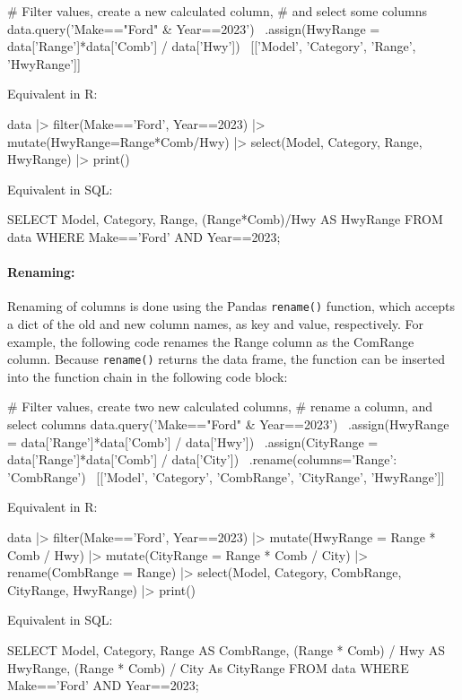 \begin{pythoncode}
# Filter values, create a new calculated column,
# and select some columns
data.query('Make=="Ford" & Year==2023') \
    .assign(HwyRange = data['Range']*data['Comb'] / data['Hwy']) \
    [['Model', 'Category', 'Range', 'HwyRange']]
\end{pythoncode}

\begin{multicols}{2}
Equivalent in R:
\begin{Rcode}
data |> 
  filter(Make=='Ford', 
         Year==2023) |> 
  mutate(HwyRange=Range*Comb/Hwy) |>
  select(Model, Category, 
         Range, HwyRange) |>
  print()
\end{Rcode}

Equivalent in SQL:

\begin{sqlcode}
SELECT Model, Category, Range, 
     (Range*Comb)/Hwy AS HwyRange 
   FROM data 
   WHERE Make=='Ford' AND 
         Year==2023;
\end{sqlcode}
\end{multicols}

\paragraph*{Renaming:} Renaming of columns is done using the Pandas \texttt{rename()} function, which accepts a dict of the old and new column names, as key and value, respectively. For example, the following code renames the Range column as the ComRange column. Because \texttt{rename()} returns the data frame, the function can be inserted into the function chain in the following code block:

\begin{pythoncode}
# Filter values, create two new calculated columns,
# rename a column, and select columns
data.query('Make=="Ford" & Year==2023') \
    .assign(HwyRange = data['Range']*data['Comb'] / data['Hwy']) \
    .assign(CityRange = data['Range']*data['Comb'] / data['City']) \
    .rename(columns={'Range': 'CombRange'}) \
    [['Model', 'Category', 'CombRange', 'CityRange', 'HwyRange']]
\end{pythoncode}

\begin{multicols}{2}
Equivalent in R:

\begin{Rcode}
data |> 
  filter(Make=='Ford', 
         Year==2023) |> 
  mutate(HwyRange = 
     Range * Comb / Hwy) |>
  mutate(CityRange = 
     Range * Comb / City) |>
  rename(CombRange = Range) |>
  select(Model, Category, 
         CombRange, CityRange, 
         HwyRange) |>
  print()
\end{Rcode}

Equivalent in SQL:

\begin{sqlcode}
SELECT Model, Category, 
      Range AS CombRange,
      (Range * Comb) / Hwy 
          AS HwyRange, 
      (Range * Comb) / City 
          As CityRange
   FROM data 
   WHERE Make=='Ford' AND 
         Year==2023;
\end{sqlcode}
\end{multicols}

